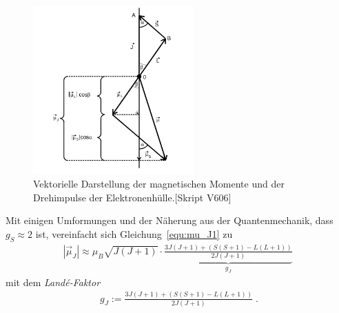 \begin{figure}[H]
 \centering
 \includegraphics[width=0.55\textwidth]{../figures/vektor.png}
 \caption{Vektorielle Darstellung der magnetischen Momente und der Drehimpulse der Elektronenhülle.[Skript V606]}
 \label{fig:vektor}
\end{figure}

Mit einigen Umformungen und der Näherung aus der Quantenmechanik, dass $g_S \approx 2$ ist, vereinfacht sich Gleichung~\eqref{equ:mu_J1} zu
\begin{align}
  \label{equ:mu_J2}
  | \vec \mu_J | \approx \mu_B \sqrt{J(J+1)} \cdot \underbrace{\frac{3J(J+1) + (S(S+1)-L(L+1))}{2 J(J+1)}}_{g_J} \;
\end{align}
mit dem \emph{Landé-Faktor}
\begin{align}
  \label{equ:lande}
  g_J := \frac{3J(J+1) + (S(S+1)-L(L+1))}{2 J(J+1)} \; .
\end{align}

